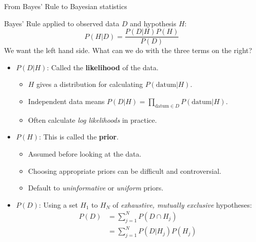 \documentclass[
  ignorenonframetext,
]{beamer}
\providecommand{\tightlist}{%
  \setlength{\itemsep}{0pt}\setlength{\parskip}{0pt}}
\begin{document}
\begin{frame}{From Bayes' Rule to Bayesian statistics}
\protect\hypertarget{from-bayes-rule-to-bayesian-statistics}{}

\footnotesize

Bayes' Rule applied to observed data \(D\) and hypothesis \(H\): \[
P(H|D)=\frac{P(D|H)P(H)}{P(D)}
\] We want the left hand side. What can we do with the three terms on
the right?

\begin{itemize}
\tightlist
\item
  \(P(D|H)\): Called the \textbf{likelihood} of the data.

  \begin{itemize}
  \tightlist
  \item
    \(H\) gives a distribution for calculating \(P(\text{datum}|H)\).
  \item
    Independent data means
    \(P(D|H)=\prod_{\text{datum}\in D} P(\text{datum}|H)\).
  \item
    Often calculate \emph{log likelihoods} in practice.
  \end{itemize}
\item
  \(P(H)\): This is called the \textbf{prior}.

  \begin{itemize}
  \tightlist
  \item
    Assumed before looking at the data.
  \item
    Choosing appropriate priors can be difficult and controversial.
  \item
    Default to \emph{uninformative} or \emph{uniform} priors.
  \end{itemize}
\item
  \(P(D)\): Using a set \(H_1\) to \(H_N\) of \emph{exhaustive, mutually
  exclusive} hypotheses: \begin{align*}
  P(D) & = \sum_{j=1}^N P(D\cap H_j)\\
  & =  \sum_{j=1}^N P(D|H_j)P(H_j)
  \end{align*}
\end{itemize}

\end{frame}
\end{document}
